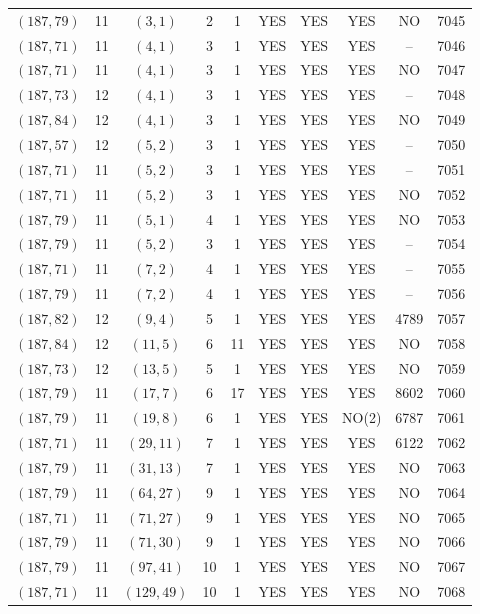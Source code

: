 \begin{longtable}{|c|c|c|c|c|c|c|c|c|c|}
$(187, 79)$ & 11 & $(3, 1)$ & 2 & 1 & YES & YES & YES & NO & 7045\\
$(187, 71)$ & 11 & $(4, 1)$ & 3 & 1 & YES & YES & YES & -- & 7046\\
$(187, 71)$ & 11 & $(4, 1)$ & 3 & 1 & YES & YES & YES & NO & 7047\\
$(187, 73)$ & 12 & $(4, 1)$ & 3 & 1 & YES & YES & YES & -- & 7048\\
$(187, 84)$ & 12 & $(4, 1)$ & 3 & 1 & YES & YES & YES & NO & 7049\\
$(187, 57)$ & 12 & $(5, 2)$ & 3 & 1 & YES & YES & YES & -- & 7050\\
$(187, 71)$ & 11 & $(5, 2)$ & 3 & 1 & YES & YES & YES & -- & 7051\\
$(187, 71)$ & 11 & $(5, 2)$ & 3 & 1 & YES & YES & YES & NO & 7052\\
$(187, 79)$ & 11 & $(5, 1)$ & 4 & 1 & YES & YES & YES & NO & 7053\\
$(187, 79)$ & 11 & $(5, 2)$ & 3 & 1 & YES & YES & YES & -- & 7054\\
$(187, 71)$ & 11 & $(7, 2)$ & 4 & 1 & YES & YES & YES & -- & 7055\\
$(187, 79)$ & 11 & $(7, 2)$ & 4 & 1 & YES & YES & YES & -- & 7056\\
$(187, 82)$ & 12 & $(9, 4)$ & 5 & 1 & YES & YES & YES & 4789 & 7057\\
$(187, 84)$ & 12 & $(11, 5)$ & 6 & 11 & YES & YES & YES & NO & 7058\\
$(187, 73)$ & 12 & $(13, 5)$ & 5 & 1 & YES & YES & YES & NO & 7059\\
$(187, 79)$ & 11 & $(17, 7)$ & 6 & 17 & YES & YES & YES & 8602 & 7060\\
$(187, 79)$ & 11 & $(19, 8)$ & 6 & 1 & YES & YES & NO(2) & 6787 & 7061\\
$(187, 71)$ & 11 & $(29, 11)$ & 7 & 1 & YES & YES & YES & 6122 & 7062\\
$(187, 79)$ & 11 & $(31, 13)$ & 7 & 1 & YES & YES & YES & NO & 7063\\
$(187, 79)$ & 11 & $(64, 27)$ & 9 & 1 & YES & YES & YES & NO & 7064\\
$(187, 71)$ & 11 & $(71, 27)$ & 9 & 1 & YES & YES & YES & NO & 7065\\
$(187, 79)$ & 11 & $(71, 30)$ & 9 & 1 & YES & YES & YES & NO & 7066\\
$(187, 79)$ & 11 & $(97, 41)$ & 10 & 1 & YES & YES & YES & NO & 7067\\
$(187, 71)$ & 11 & $(129, 49)$ & 10 & 1 & YES & YES & YES & NO & 7068\\

\end{longtable}
